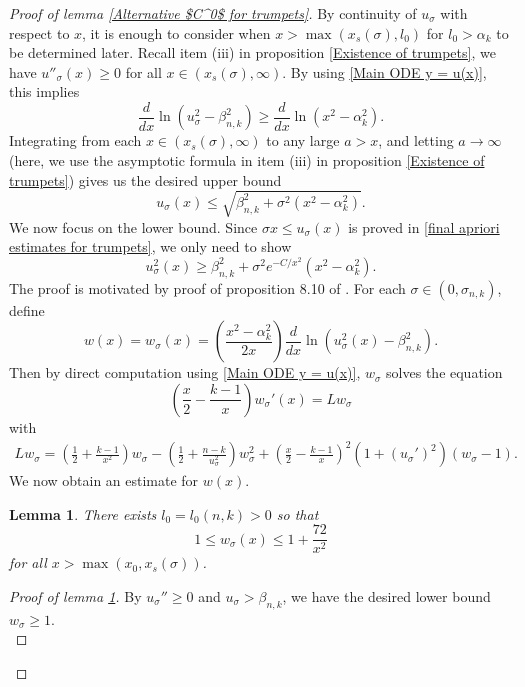 \documentclass[pdflatex,sn-mathphys-num]{sn-jnl}
\newtheorem{lemma}[theorem]{Lemma}
\begin{document}
\begin{proof}[Proof of lemma \ref{Alternative $C^0$ for trumpets}]
    By continuity of $u_{\sigma}$ with respect to $x$, it is enough to consider when $x > \max(x_{s}(\sigma), l_0)$ for $l_0 > \alpha_k$ to be determined later. Recall item (iii) in proposition \ref{Existence of trumpets}, we have $u''_{\sigma}(x) \geq 0$ for all $x \in (x_{s}(\sigma), \infty)$. By using \eqref{Main ODE y = u(x)}, this implies
\begin{equation}
    \frac{d}{dx}\ln(u_{\sigma}^2 - \beta_{n,k}^2) \geq \frac{d}{dx}\ln(x^2 - \alpha_k^2).
\end{equation}
   Integrating from each $x \in (x_{s}(\sigma), \infty)$ to any large $a > x$, and letting $a \to \infty$ (here, we use the asymptotic formula in item (iii) in proposition \ref{Existence of trumpets}) gives us the desired upper bound
    \begin{equation}
        u_{\sigma}(x) \leq \sqrt{\beta_{n,k}^2 + \sigma^2(x^2 - \alpha_k^2)}.
    \end{equation}
    We now focus on the lower bound. Since $\sigma x \leq u_{\sigma}(x)$ is proved in \eqref{final apriori estimates for trumpets}, we only need to show
    \begin{equation}
        u_{\sigma}^2(x) \geq \beta_{n,k}^2 + \sigma^2e^{-C/x^2}(x^2 - \alpha_k^2).
    \end{equation}
    The proof is motivated by proof of proposition 8.10 of \cite{ADS}. For each $\sigma \in (0, \sigma_{n,k})$, define
\begin{equation}
    w(x) = w_{\sigma}(x) = (\frac{x^2 - \alpha_k^2}{2x})\frac{d}{dx}\ln(u_{\sigma}^2(x) - \beta_{n,k}^2).
\end{equation}
Then by direct computation using \eqref{Main ODE y = u(x)}, $w_{\sigma}$ solves the equation
\begin{equation}\label{ODE for w in trumpet}
    (\frac{x}{2} - \frac{k-1}{x})w_{\sigma}'(x) = Lw_{\sigma}
\end{equation}
with
\begin{align*}
     Lw_{\sigma} = (\frac{1}{2} + \frac{k-1}{x^2})w_{\sigma} - (\frac{1}{2} + \frac{n-k}{u_{\sigma}^2})w_{\sigma}^2 + (\frac{x}{2} - \frac{k-1}{x})^2(1 + (u_{\sigma}')^2)(w_{\sigma} - 1).
\end{align*}
We now obtain an estimate for $w(x)$.
\begin{lemma}\label{Derivative bound for trumpets}
    There exists $l_0 = l_0(n, k) > 0$ so that
    \begin{equation}
        1 \leq w_{\sigma}(x) \leq 1 + \frac{72}{x^2}
    \end{equation}
    for all $x >\max(x_0, x_{s}(\sigma))$.
\end{lemma}
\begin{proof}[Proof of lemma \ref{Derivative bound for trumpets}]
 By $u_{\sigma}'' \geq 0$ and $u_{\sigma} > \beta_{n,k}$, we have the desired lower bound $w_{\sigma} \geq 1$. \\
 

\end{proof}
\end{proof}
\end{document}
